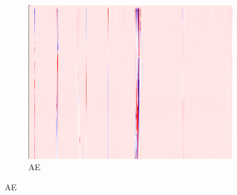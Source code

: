 \begin{figure}[h]
\begin{subfigure}{0.33\textwidth}
        \includegraphics[width=\textwidth]{figures/test.png}
        \caption{AE}
    \end{subfigure}
    
    \vspace{1em}
    

\end{figure}
